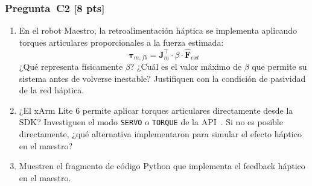 \documentclass[journal,10pt,twoside]{IEEEtran}
\newcommand{\pts}[1]{\textbf{\color{tec_red}[#1 pts]}}
\begin{document}
\subsubsection*{Pregunta~C2 \pts{8}}
\begin{enumerate}[label=(\alph*)]
  \item En el robot Maestro, la retroalimentación háptica se implementa
        aplicando torques articulares proporcionales a la fuerza estimada:
        \[
          \bm{\tau}_{m,fb} = \bm{J}_m^\top \cdot \beta \cdot \hat{\bm{F}}_{ext}
        \]
        ¿Qué representa físicamente $\beta$?
        ¿Cuál es el valor máximo de $\beta$ que permite su sistema
        antes de volverse inestable?
        Justifiquen con la condición de pasividad de la red háptica.
  \item ¿El xArm Lite 6 permite aplicar torques articulares directamente
        desde la SDK? Investiguen el modo \texttt{SERVO} o
        \texttt{TORQUE} de la API~\cite{xarm_github}.
        Si no es posible directamente, ¿qué alternativa implementaron
        para simular el efecto háptico en el maestro?
  \item Muestren el fragmento de código Python que implementa el
        feedback háptico en el maestro.
\end{enumerate}
\end{document}
